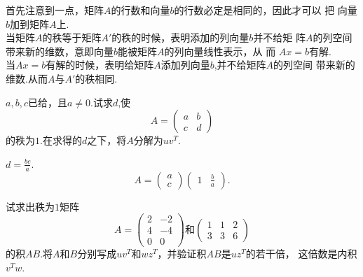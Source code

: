 ﻿\documentclass{book} \usepackage{exsheets} \usepackage{xeCJK}
\begin{document}
\begin{solution}
  首先注意到一点，矩阵$A$的行数和向量$b$的行数必定是相同的，因此才可以
  把
  向量$b$加到矩阵$A$上.\\

  当矩阵$A$的秩等于矩阵$A'$的秩的时候，表明添加的列向量$b$并不给矩
  阵$A$的列空间带来新的维数，意即向量$b$能被矩阵$A$的列向量线性表示，从
  而
  $Ax=b$有解.\\

  当$Ax=b$有解的时候，表明给矩阵$A$添加列向量$b$,并不给矩阵$A$的列空间
  带来新的维数.从而$A$与$A'$的秩相同.
\end{solution}
\begin{question}
  $a,b,c$已给，且$a\neq 0$.试求$d$,使
$$
A=
\begin{pmatrix}
  a&b\\
  c&d
\end{pmatrix}
$$
的秩为$1$.在求得的$d$之下，将$A$分解为$uv^T$.
\end{question}
\begin{solution}
  $d=\frac{bc}{a}$.
$$
A=
\begin{pmatrix}
  a\\
  c
\end{pmatrix}
\begin{pmatrix}
  1& \frac{b}{a}
\end{pmatrix}.
$$
\end{solution}
\begin{question}
  试求出秩为$1$矩阵
$$
A=
\begin{pmatrix}
  2&-2\\
  4&-4\\
  0&0
\end{pmatrix}\mbox{和}
\begin{pmatrix}
  1&1&2\\
  3&3&6
\end{pmatrix}
$$
的积$AB$.将$A$和$B$分别写成$uv^T$和$wz^T$，并验证积$AB$是$uz^T$的若干倍，
这倍数是内积$v^Tw$.
\end{question}
\end{document}
